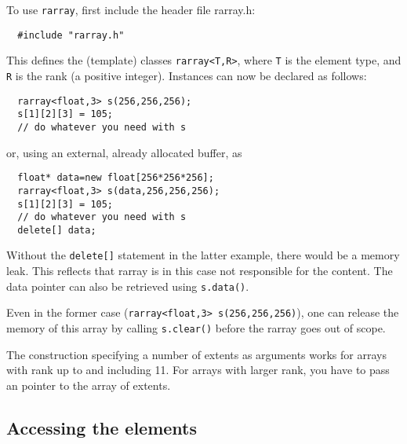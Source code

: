 \documentclass[11pt,twoside]{article}
\begin{document}
To use \texttt{rarray}, first include the header file rarray.h:
\begin{framed}\vspace{-14pt}%
\begin{verbatim}
  #include "rarray.h"
\end{verbatim}%
\vspace{-14pt}
\end{framed}
This defines the (template) classes \texttt{rarray{\tt<}T,R{\tt>}}, where
\texttt T is the element type, and \texttt R is the
rank (a positive integer).  Instances can now be
declared as follows:
\begin{framed}\vspace{-18pt}%
\begin{verbatim}
  rarray<float,3> s(256,256,256);
  s[1][2][3] = 105;
  // do whatever you need with s
\end{verbatim}%
\vspace{-14pt}
\end{framed}
\noindent
or, using an external, already allocated buffer, as
\begin{framed}\vspace{-18pt}%
\begin{verbatim}
  float* data=new float[256*256*256];  
  rarray<float,3> s(data,256,256,256);
  s[1][2][3] = 105;
  // do whatever you need with s
  delete[] data;
\end{verbatim}%
\vspace{-14pt}
\end{framed}
Without the \texttt{delete[]} statement in the latter example, there would be a memory leak. This reflects that rarray is in this case not responsible
for the content. The data pointer can also be retrieved using
\texttt{s.data()}. 

Even in the former case (\texttt{rarray<float,3> s(256,256,256)}), one can release the memory of this array by calling \texttt{s.clear()} before the rarray goes out of scope.

The construction specifying a number of extents as arguments works for arrays with rank up to and including 11. For arrays with larger rank, you have to pass an pointer to the array of extents.

\subsection{Accessing the elements}
\end{document}
